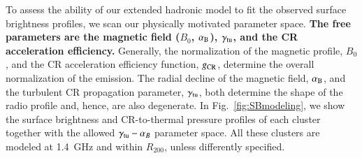 \documentclass[useAMS,usenatbib]{mn2e}
\begin{document}
To assess the ability of our extended hadronic model to fit the observed surface
brightness profiles, we scan our physically motivated parameter space. {\bf The free 
parameters are the magnetic field ($B_0$, $ \alpha_{{\mathrm{B}}}$), 
$\gamma_{{\mathrm{tu}}}$, and the CR acceleration efficiency.} Generally, the normalization 
of the magnetic profile, $B_0$, and the CR acceleration efficiency function, $g_{{\mathrm{CR}}}$, 
determine the overall normalization of the emission. The radial decline of the magnetic field,
$ \alpha_{{\mathrm{B}}}$, and the turbulent CR propagation parameter, $\gamma_{{\mathrm{tu}}}$, both
determine the shape of the radio profile and, hence, are also degenerate. 
In Fig.~\ref{fig:SBmodeling}, we show the surface brightness and CR-to-thermal
pressure profiles of each cluster together with the allowed $\gamma_{{\mathrm{tu}}}-\alpha_{B}$ parameter space. 
All these clusters are modeled at 1.4~GHz and within $R_{200}$, unless differently specified.
\end{document}

